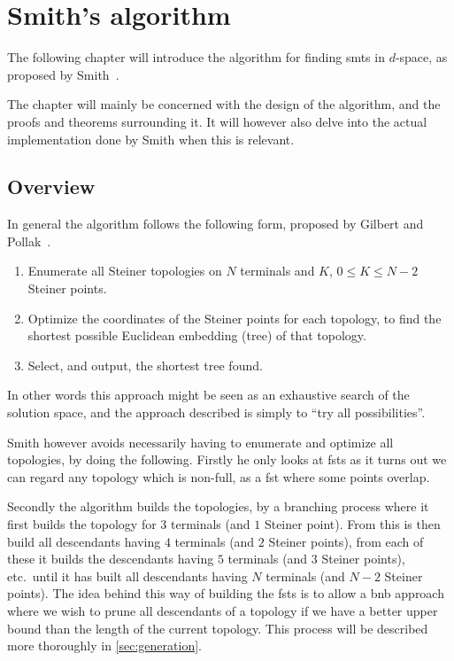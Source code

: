 { \abnormalparskip{0pt}
\chapter{Smith's algorithm}
\label{cha:algorithm} }


The following chapter will introduce the algorithm for finding \glspl{smt} in
$d$-space, as proposed by Smith~\cite{Smith1992}.

The chapter will mainly be concerned with the design of the algorithm, and the
proofs and theorems surrounding it.  It will however also delve into the actual
implementation done by Smith when this is relevant.

\section{Overview}
\label{sec:overview}

In general the algorithm follows the following form, proposed by Gilbert and
Pollak~\cite{Gilbert1968}.

\begin{enumerate}
\item Enumerate all Steiner topologies on $N$ terminals and $K$, $0 \le K \le
N-2$ Steiner points.
\item Optimize the coordinates of the Steiner points for each topology, to find
the shortest possible Euclidean embedding (tree) of that topology.
\item Select, and output, the shortest tree found.
\end{enumerate}

In other words this approach might be seen as an exhaustive search of the
solution space, and the approach described is simply to ``try all
possibilities''.

Smith however avoids necessarily having to enumerate and optimize all
topologies, by doing the following.  Firstly he only looks at \glspl{fst} as it
turns out we can regard any topology which is non-full, as a \gls{fst} where
some points overlap.

Secondly the algorithm builds the topologies, by a branching process where it
first builds the topology for $3$ terminals (and $1$ Steiner point).  From this
is then build all descendants having $4$ terminals (and $2$ Steiner points),
from each of these it builds the descendants having $5$ terminals (and $3$
Steiner points), etc.\ until it has built all descendants having $N$ terminals
(and $N-2$ Steiner points).  The idea behind this way of building the
\glspl{fst} is to allow a \gls{bnb} approach where we wish to prune all
descendants of a topology if we have a better upper bound than the length of the
current topology.  This process will be described more thoroughly in
\cref{sec:generation}.

